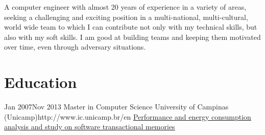\documentclass[10pt]{article} %
\begin{document}


A computer engineer with almost 20 years of experience in a variety of areas, seeking a challenging and exciting position in a multi-national, multi-cultural, world wide team to which I can contribute not only with my technical skills, but also with my soft skills. I am good at building teams and keeping them motivated over time, even through adversary situations.



\section{Education}

\education
{Jan 2007}{Nov 2013}
{Master in Computer Science}
{University of Campinas (Unicamp)}{http://www.ic.unicamp.br/en}
{\href{http://repositorio.unicamp.br/jspui/handle/REPOSIP/275619}{Performance and energy consumption analysis and study on software transactional memories}}
\end{document}
